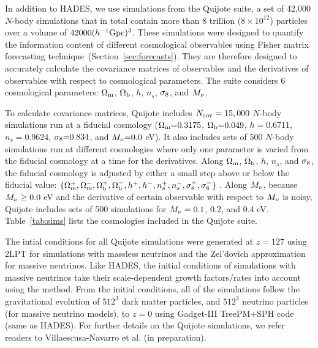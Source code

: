 In addition to HADES, we use simulations from the Quijote suite, a
set of 42,000 $N$-body simulations that in total contain more than 8 trillion 
($8\times10^{12}$) particles over a volume of $42000 (h^{-1}{\rm Gpc})^3$. 
These simulations were designed to quantify the information content of 
different cosmological observables using Fisher matrix forecasting 
technique~(Section~\ref{sec:forecasts}). They are therefore designed to accurately calculate 
the covariance matrices of observables and the derivatives of observables with 
respect to cosmological parameters. The suite considers 6 cosmological parameters: 
$\Omega_{\rm m}$, $\Omega_{\rm b}$, $h$, $n_s$, $\sigma_8$, and $M_\nu$.

To calculate covariance matrices, Quijote includes $N_{\rm cov} = 15,000$ $N$-body 
simulations run at a fiducial cosmology ($\Omega_{\rm m}{=}0.3175$, $\Omega_{\rm b}{=}0.049$, $h{=}0.6711$, 
$n_s{=}0.9624$, $\sigma_8{=}0.834$, and $M_\nu{=}0.0$ eV). It also includes sets 
of 500 $N$-body simulations run at different cosmologies where only one parameter 
is varied from the fiducial cosmology at a time for the derivatives. Along $\Omega_{\rm m}$, 
$\Omega_{\rm b}$, $h$, $n_s$, and $\sigma_8$, the fiducial cosmology is adjusted by either a 
small step above or below the fiducial value: 
$\{\Omega_{\rm m}^{+}, \Omega_{\rm m}^{-}, \Omega_{\rm b}^{+}, \Omega_{\rm b}^{-}, h^+, h^-, n_s^{+}, n_s^{-}, \sigma_8^{+}, \sigma_8^-\}$ . 
Along $M_\nu$, because $M_\nu \ge 0.0$ eV and the derivative of certain observable 
with respect to $M_\nu$ is noisy, Quijote includes sets of 500 simulations for 
$M_\nu = 0.1$, 0.2, and 0.4 eV. Table~\ref{tab:sims} lists the cosmologies included 
in the Quijote suite. 

The intial conditions for all Quijote simulations were generated at $z=127$ using 
2LPT for simulations with massless neutrinos and the Zel’dovich approximation for 
massive neutrinos. Like HADES, the initial conditions of simulations with massive
neutrinos take their scale-dependent growth factors/rates into account using the
\cite{zennaro2017a} method. From the initial conditions, all of the simulations 
follow the gravitational evolution of $512^3$ dark matter particles, and $512^3$ 
neutrino particles (for massive neutrino models), to $z=0$ using {\sc Gadget-III}
TreePM+SPH code (same as HADES). 
For further details on the Quijote simulations, we refer readers to 
Villaescusa-Navarro et al. (in preparation). 

